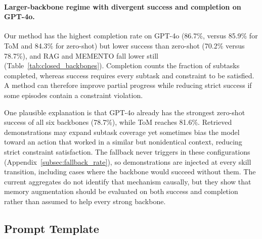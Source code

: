 \documentclass{article}
\theoremstyle{plain}
\theoremstyle{definition}
\theoremstyle{remark}
\begin{document}
\paragraph{Larger-backbone regime with divergent success and completion on GPT-4o.} Our method has the highest completion rate on GPT-4o (86.7\%, versus 85.9\% for ToM and 84.3\% for zero-shot) but lower success than zero-shot (70.2\% versus 78.7\%), and RAG and MEMENTO fall lower still (Table~\ref{tab:closed_backbones}). Completion counts the fraction of subtasks completed, whereas success requires every subtask and constraint to be satisfied. A method can therefore improve partial progress while reducing strict success if some episodes contain a constraint violation.

One plausible explanation is that GPT-4o already has the strongest zero-shot success of all six backbones (78.7\%), while ToM reaches 81.6\%. Retrieved demonstrations may expand subtask coverage yet sometimes bias the model toward an action that worked in a similar but nonidentical context, reducing strict constraint satisfaction. The fallback never triggers in these configurations (Appendix~\ref{subsec:fallback_rate}), so demonstrations are injected at every skill transition, including cases where the backbone would succeed without them. The current aggregates do not identify that mechanism causally, but they show that memory augmentation should be evaluated on both success and completion rather than assumed to help every strong backbone.


\subsection{Prompt Template}
\label{sec:prompts}
\end{document}
